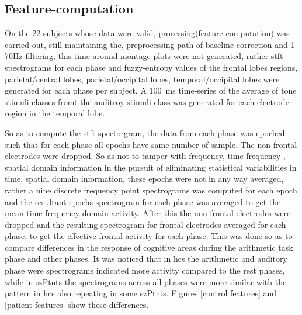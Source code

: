 \documentclass[10pt]{article}
\begin{document}
\subsection{Feature-computation}\label{ssec:features}
On the 22 subjects whose data were valid, processing(feature computation) was carried out, still maintaining the, 
preprocessing path of baseline correction and 1-70Hz filtering, this time around montage plots were not 
generated, rather \gls{stft} spectrograms for each phase and fuzzy-entropy values of the frontal lobes regions,
 parietal/central lobes, parietal/occipital lobes, temporal/occipital lobes were generated for each phase per 
 subject. A \SI{100}{\milli\second} time-series of the average of tone stimuli classes fromt the auditroy stimuli class 
 was generated for each electrode region in the temporal lobe.

So as to compute the \gls{stft} spectorgram, the data from each phase was epoched such that for 
each phase all epochs have same number of sample. The non-frontal electrodes were dropped. So as 
not to tamper with frequency, time-frequency , spatial domain information in the pursuit of eliminating 
statistical variabilities in time, spatial domain information, these epochs were not in any way averaged, 
rather a  nine discrete frequency point spectrograms was computed for each epoch and the resultant epochs 
spectrogram for each phase was averaged to get the mean time-frequency domain activity. After this the 
non-frontal electrodes were dropped and the resulting spectrogram for frontal electrodes averaged for each phase, to
 get the effective frontal activity for each phase. This was done so as to compare differences in the response of cognitive areas 
 during the arithmetic task phase and other phases. It was noticed that in \glspl{hc} the arithmetic and auditory phase were 
spectrograms indicated more activity compared to the rest phases, while in \glspl{szPtnt} the spectrograms across all phases 
were more similar with the pattern in \glspl{hc} also repeating in some \glspl{szPtnt}. Figures \ref{control features} and 
\ref{patient features} show these differences.
\end{document}
